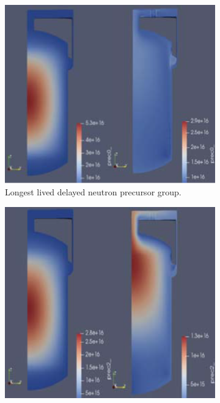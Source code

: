 
\begin{figure}[H]
\centering
\begin{subfigure}{0.4\textwidth}
    \includegraphics[scale=0.25]{images/dnp1.PNG}
    \caption{Longest lived delayed neutron precursor group.}
    \label{fig:first}
\end{subfigure}
\hfill
\centering
\begin{subfigure}{0.4\textwidth}
    \includegraphics[scale=0.25]{images/dnp3.PNG}

\end{subfigure}
\end{figure}
